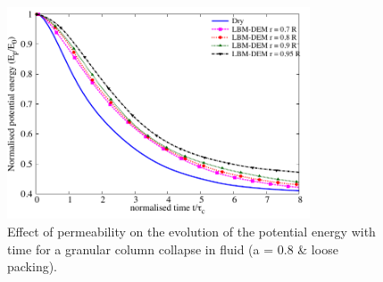 \begin{figure}
	\centering
    \includegraphics[width=0.8\textwidth]{PE_a08_loose}
    \caption{Effect of permeability on the evolution of the potential energy 
    with time for a granular column collapse in fluid (a = 0.8 \& loose 
    packing).}
    \label{fig:PE_a08_loose}
\end{figure}


